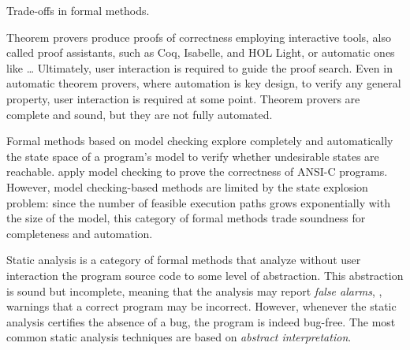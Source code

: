 \begin{marginfigure}
  \centering
  \caption{Trade-offs in formal methods.}
\end{marginfigure}

Theorem provers produce proofs of correctness employing interactive tools, also called proof assistants, such as Coq, Isabelle, and HOL Light, or automatic ones like \dots
Ultimately, user interaction is required to guide the proof search.
Even in automatic theorem provers, where automation is key design, to verify any general property, user interaction is required at some point.
Theorem provers are complete and sound, but they are not fully automated.

Formal methods based on model checking explore completely and automatically the state space of a program's model to verify whether undesirable states are reachable.
 apply model checking to prove the correctness of ANSI-C programs.
However, model checking-based methods are limited by the state explosion problem: since the number of feasible execution paths grows exponentially with the size of the model, this category of formal methods trade soundness for completeness and automation.

Static analysis is a category of formal methods that analyze without user interaction the program source code to some level of abstraction.
This abstraction is sound but incomplete, meaning that the analysis may report \emph{false alarms}, \ie, warnings that a correct program may be incorrect. However, whenever the static analysis certifies the absence of a bug, the program is indeed bug-free.
The most common static analysis techniques are based on \emph{abstract interpretation}.

